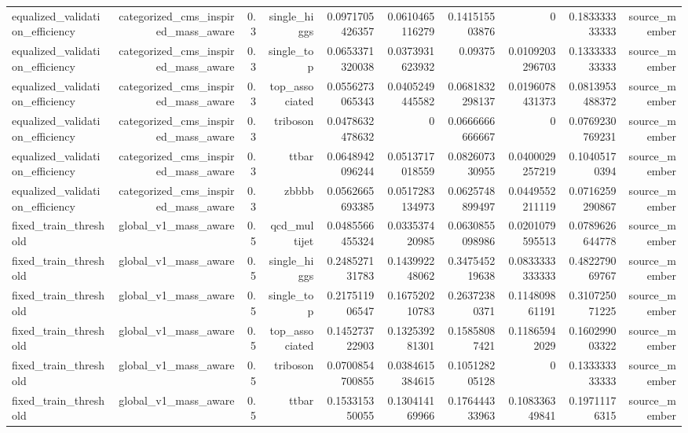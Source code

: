 \begin{table}[htbp]
{\begin{tabular}{lrrrrrrrrr}
equalized\_validation\_efficiency & categorized\_cms\_inspired\_mass\_aware & 0.3 & single\_higgs & 0.0971705426357 & 0.0610465116279 & 0.141515503876 & 0 & 0.183333333333 & source\_member \\
equalized\_validation\_efficiency & categorized\_cms\_inspired\_mass\_aware & 0.3 & single\_top & 0.0653371320038 & 0.0373931623932 & 0.09375 & 0.0109203296703 & 0.133333333333 & source\_member \\
equalized\_validation\_efficiency & categorized\_cms\_inspired\_mass\_aware & 0.3 & top\_associated & 0.0556273065343 & 0.0405249445582 & 0.0681832298137 & 0.0196078431373 & 0.0813953488372 & source\_member \\
equalized\_validation\_efficiency & categorized\_cms\_inspired\_mass\_aware & 0.3 & triboson & 0.0478632478632 & 0 & 0.0666666666667 & 0 & 0.0769230769231 & source\_member \\
equalized\_validation\_efficiency & categorized\_cms\_inspired\_mass\_aware & 0.3 & ttbar & 0.0648942096244 & 0.0513717018559 & 0.082607330955 & 0.0400029257219 & 0.10405170394 & source\_member \\
equalized\_validation\_efficiency & categorized\_cms\_inspired\_mass\_aware & 0.3 & zbbbb & 0.0562665693385 & 0.0517283134973 & 0.0625748899497 & 0.0449552211119 & 0.0716259290867 & source\_member \\
fixed\_train\_threshold & global\_v1\_mass\_aware & 0.5 & qcd\_multijet & 0.0485566455324 & 0.033537420985 & 0.0630855098986 & 0.0201079595513 & 0.0789626644778 & source\_member \\
fixed\_train\_threshold & global\_v1\_mass\_aware & 0.5 & single\_higgs & 0.248527131783 & 0.143992248062 & 0.347545219638 & 0.0833333333333 & 0.482279069767 & source\_member \\
fixed\_train\_threshold & global\_v1\_mass\_aware & 0.5 & single\_top & 0.217511906547 & 0.167520210783 & 0.26372380371 & 0.114809861191 & 0.310725071225 & source\_member \\
fixed\_train\_threshold & global\_v1\_mass\_aware & 0.5 & top\_associated & 0.145273722903 & 0.132539281301 & 0.15858087421 & 0.11865942029 & 0.160299003322 & source\_member \\
fixed\_train\_threshold & global\_v1\_mass\_aware & 0.5 & triboson & 0.0700854700855 & 0.0384615384615 & 0.105128205128 & 0 & 0.133333333333 & source\_member \\
fixed\_train\_threshold & global\_v1\_mass\_aware & 0.5 & ttbar & 0.153315350055 & 0.130414169966 & 0.176444333963 & 0.108336349841 & 0.19711176315 & source\_member \\

\end{tabular}}
\end{table}
